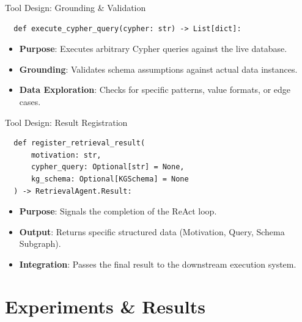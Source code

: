 \documentclass[aspectratio=169]{beamer}
\begin{document}
\begin{frame}[fragile]{Tool Design: Grounding \& Validation}
  \begin{verbatim}
  def execute_cypher_query(cypher: str) -> List[dict]:
  \end{verbatim}
  \vspace{0.5em}
\begin{itemize}
    \item \textbf{Purpose}: Executes arbitrary Cypher queries against the live database.
    \item \textbf{Grounding}: Validates schema assumptions against actual data instances.
    \item \textbf{Data Exploration}: Checks for specific patterns, value formats, or edge cases.
\end{itemize}
\end{frame}

\begin{frame}[fragile]{Tool Design: Result Registration}
  \begin{verbatim}
  def register_retrieval_result(
      motivation: str,
      cypher_query: Optional[str] = None,
      kg_schema: Optional[KGSchema] = None
  ) -> RetrievalAgent.Result:
  \end{verbatim}
\vspace{0.5em}
\begin{itemize}
    \item \textbf{Purpose}: Signals the completion of the ReAct loop.
    \item \textbf{Output}: Returns specific structured data (Motivation, Query, Schema Subgraph).
    \item \textbf{Integration}: Passes the final result to the downstream execution system.
\end{itemize}
\end{frame}

\section{Experiments \& Results}
\end{document}

